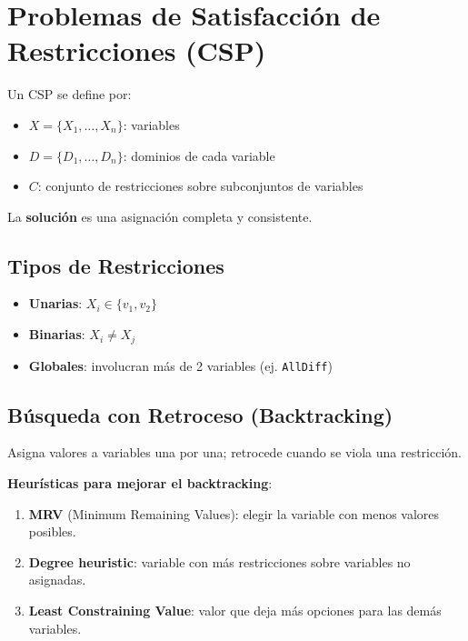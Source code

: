 \section{Problemas de Satisfacción de Restricciones (CSP)}

\begin{definition}[CSP]
Un CSP se define por:
\begin{itemize}
    \item $X = \{X_1, \ldots, X_n\}$: variables
    \item $D = \{D_1, \ldots, D_n\}$: dominios de cada variable
    \item $C$: conjunto de restricciones sobre subconjuntos de variables
\end{itemize}
La \textbf{solución} es una asignación completa y consistente.
\end{definition}

\subsection{Tipos de Restricciones}

\begin{itemize}
    \item \textbf{Unarias}: $X_i \in \{v_1, v_2\}$
    \item \textbf{Binarias}: $X_i \neq X_j$
    \item \textbf{Globales}: involucran más de 2 variables (ej. \texttt{AllDiff})
\end{itemize}

\subsection{Búsqueda con Retroceso (Backtracking)}

Asigna valores a variables una por una; retrocede cuando se viola una restricción.

\textbf{Heurísticas para mejorar el backtracking}:
\begin{enumerate}
    \item \textbf{MRV} (Minimum Remaining Values): elegir la variable con menos valores posibles.
    \item \textbf{Degree heuristic}: variable con más restricciones sobre variables no asignadas.
    \item \textbf{Least Constraining Value}: valor que deja más opciones para las demás variables.
\end{enumerate}

